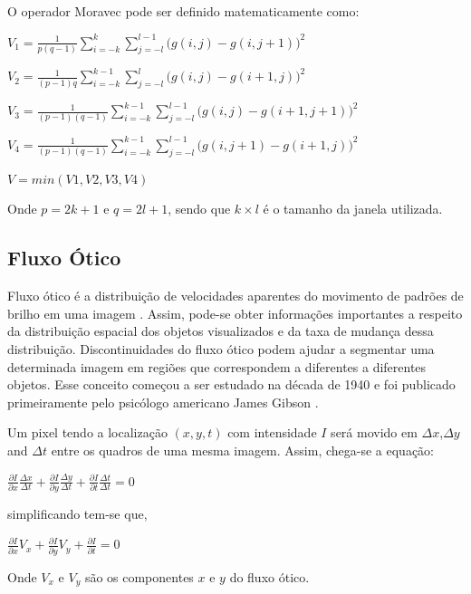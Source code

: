 \documentclass[9pt, a4paper, nofonttune, journal]{IEEEtran}
\begin{document}
O operador Moravec pode ser definido matematicamente como:
    \begin{center}$V_{1}=\frac{1}{p(q-1)}\sum_{i=-k}^k\sum_{j=-l}^{l-1}\bigl(g(i,j)-g(i,j+1)\bigr)^2$    \end{center}
    \begin{center}$V_{2}=\frac{1}{(p-1)q}\sum_{i=-k}^{k-1}\sum_{j=-l}^l\bigl(g(i,j)-g(i+1,j)\bigr)^2$    \end{center}
    \begin{center}$V_{3}=\frac{1}{(p-1)(q-1)}\sum_{i=-k}^{k-1}\sum_{j=-l}^{l-1}\bigl(g(i,j)-g(i+1,j+1)\bigr)^2$\end{center}
    \begin{center}$V_{4}=\frac{1}{(p-1)(q-1)}\sum_{i=-k}^{k-1}\sum_{j=-l}^{l-1}\bigl(g(i,j+1)-g(i+1,j)\bigr)^2$\end{center}
    \begin{center}$V = min(V1,V2,V3,V4)$\end{center}

    Onde $p = 2k + 1$ e $q = 2l + 1$, sendo que $k\times l$ é o tamanho da janela utilizada. 

\subsection{Fluxo Ótico}
Fluxo ótico é a distribuição de velocidades aparentes do movimento de padrões de brilho em uma imagem \cite{GibsonBook1}. Assim, pode-se obter informações importantes a respeito da distribuição espacial dos objetos visualizados 
e da taxa de mudança dessa distribuição. Discontinuidades do fluxo ótico podem ajudar a segmentar uma determinada imagem 
em regiões que correspondem a diferentes a diferentes objetos.
Esse conceito começou a ser estudado na década de 1940 e foi publicado primeiramente pelo psicólogo americano James Gibson \cite{Gibson1} \cite{OF1}.

Um pixel tendo a localização $(x,y,t)$ com intensidade $I$ será movido em $\Delta x$,$\Delta y$ and $\Delta t$ entre os quadros de uma mesma imagem.
Assim, chega-se a equação:

\begin{center}
$\frac{\partial I}{\partial x}\frac{\Delta x}{\Delta t}+\frac{\partial I}{\partial y}\frac{\Delta y}{\Delta t}+\frac{\partial I}{\partial t}\frac{\Delta t}{\Delta t} = 0 $\end{center}
simplificando tem-se que,
\begin{center}
$\frac{\partial I}{\partial x}V_x+\frac{\partial I}{\partial y}V_y+\frac{\partial I}{\partial t} = 0$\end{center}
Onde $V_x$ e $V_y$ são os componentes $x$ e $y$ do fluxo ótico.
\end{document}
